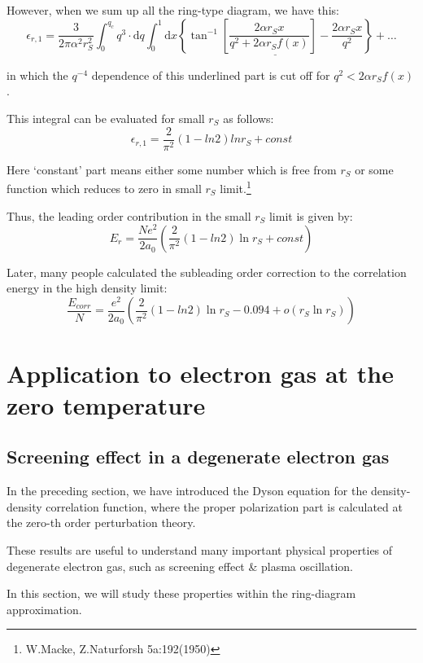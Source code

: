 However, when we sum up all the ring-type diagram, we have this:
\[ \epsilon_{r,1} = \frac{3}{2\pi \alpha^2 r_S^2}\int_0^{q_c} q^3 \cdot \mathrm{d} q \int_0^1 \mathrm{d} x \underline{\left\{ \tan^{-1}\left[ \frac{2\alpha r_S x}{q^2 + 2\alpha r_S f(x)} \right] -\frac{2\alpha r_S x}{q^2} \right\}} + \ldots \]

in which the $q^{-4}$ dependence of this underlined part is cut off for $q^2 < 2 \alpha r_S f(x)$.

This integral can be evaluated for small $r_S$ as follows:
\begin{equation} \label{Eqs2.8.42}
\epsilon_{r,1} = \frac{2}{\pi^2}(1-ln 2)ln r_S + const
\end{equation}

Here `constant' part means either some number which is free from $r_S$ or some function which reduces to zero in small $r_S$ limit.\footnote{W.Macke, Z.Naturforsh 5a:192(1950)}

Thus, the leading order contribution in the small $r_S$ limit is given by:
\[E_r = \frac{N e^2}{2 a_0} \left( \frac{2}{\pi^2} (1-ln 2) \ln r_S + const \right)\]

Later, many people calculated the subleading order correction to the correlation energy in the high density limit:
\begin{equation} \label{Eqs2.8.43}
\frac{E_{corr}}{N} = \frac{e^2}{2 a_0} \left( \frac{2}{\pi^2}(1 -ln 2) \ln r_S - 0.094 + o(r_S \ln r_S) \right)
\end{equation}

\chapter{Application to electron gas at the zero temperature}%

\section{Screening effect in a degenerate electron gas}\label{s3-1}

In the preceding section, we have introduced the Dyson equation for the density-density correlation function, where the proper polarization part is calculated at the zero-th order perturbation theory.

These results are useful to understand many important physical properties of degenerate electron gas, such as screening effect \& plasma oscillation.

In this section, we will study these properties within the ring-diagram approximation.

